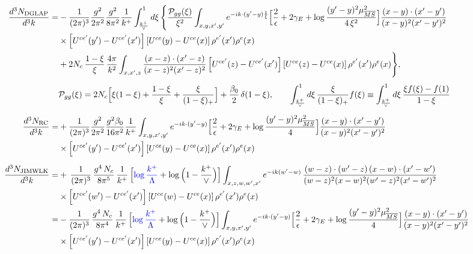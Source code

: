 \documentclass[9pt]{article}
\numberwithin{equation}{section}
\begin{document}
\begin{align}
\frac{d^{3}N_{\rm DGLAP}}{d^{3}k}= &-\frac{1}{(2\pi)^{3}}\frac{g^{2}}{2\pi^{2}}\frac{g^{2}}{8\pi^{2}}\frac{1}{k^{+}}\int_{\frac{k^{+}}{\vee}}^{1}d\xi\,\Bigg\{\frac{\mathcal P_{gg}(\xi)}{\xi^{2}}\int_{x,y,x',y'}e^{-ik\cdot(y'-y)\frac{1}{\xi}}\Big[\frac{2}{\epsilon}+2\gamma_{E}+\log\frac{(y'-y)^{2}\mu^{2}_{\overline{MS}}}{4\,\xi^{2}}\Big]\frac{(x-y)\cdot(x'-y')}{(x-y)^{2}(x'-y')^{2}}\notag\\
&\times\left[U^{ce'}(y') - U^{ce'}(x')\right]\left[U^{ce}(y) - U^{ce}(x)\right]\rho^{e'}(x')\rho^{e}(x)\notag\\
&+2N_{c}\,\frac{1-\xi}{\xi}\,\frac{4\pi}{k^{2}}\int_{x,x',z}\frac{(x-z)\cdot(x'-z)}{(x-z)^{2}(x'-z)^{2}}\left[U^{ce'}(z) - U^{ce'}(x')\right]\left[U^{ce}(z) - U^{ce}(x)\right]\rho^{e'}(x')\rho^{e}(x)\Bigg\},\\[4pt]
&\mathcal P_{gg}(\xi)=2N_{c}\Big[\xi(1-\xi)+\frac{1-\xi}{\xi}+\frac{\xi}{(1-\xi)_{+}}\Big]+\frac{\beta_{0}}{2}\,\delta(1-\xi),\qquad
\int_{\frac{k^{+}}{\vee}}^{1}d\xi\,\frac{\xi}{(1-\xi)_{+}}f(\xi)\equiv\int_{\frac{k^{+}}{\vee}}^{1}d\xi\,\frac{\xi f(\xi)-f(1)}{1-\xi}\notag\\[6pt]
\frac{d^{3}N_{\rm RC}}{d^{3}k}= & +\frac{1}{(2\pi)^{3}}\frac{g^{2}}{2\pi^{2}}\frac{g^{2}\beta_{0}}{16\pi^{2}}\frac{1}{k^{+}}\int_{x,y,x',y'}e^{-ik\cdot(y'-y)}\Big[\frac{2}{\epsilon}+2\gamma_{E}+\log\frac{(y'-y)^{2}\mu^{2}_{\overline{MS}}}{4}\Big]\frac{(x-y)\cdot(x'-y')}{(x-y)^{2}(x'-y')^{2}}\notag\\
&\times\left[U^{ce'}(y') - U^{ce'}(x')\right]\left[U^{ce}(y) - U^{ce}(x)\right]\rho^{e'}(x')\rho^{e}(x)\\[6pt]
\frac{d^{3}N_{\rm JIMWLK}}{d^{3}k}= & +\,\frac{1}{(2\pi)^{3}}\,\frac{g^{4}\,N_{c}}{8\pi^{5}}\,\frac{1}{k^{+}}\,\Big[{\color{blue}\log\frac{k^{+}}{\Lambda}}+\log\Big(1-\frac{k^{+}}{\vee}\Big)\Big]\int_{x,z,w,w',x'}e^{-ik(w'-w)}\,\frac{(w-z)\cdot (w'-z)\,(x-w)\cdot (x'-w')}{(w-z)^{2}(x-w)^{2}(w'-z)^{2}(x'-w')^{2}}\notag\\
&\times\left[U^{ce'}(w') - U^{ce'}(x')\right]\left[U^{ce}(w) - U^{ce}(x)\right]\rho^{e'}(x') \rho^{e}(x)\notag \\
= & -\frac{1}{(2\pi)^{3}}\,\frac{g^{4}\,N_{c}}{8\pi^{4}}\,\frac{1}{k^{+}}\,\Big[{\color{blue}\log\frac{k^{+}}{\Lambda}}+\log\Big(1-\frac{k^{+}}{\vee}\Big)\Big]\int_{x,y,x',y'}e^{-ik\cdot(y'-y)}\Big[\frac{2}{\epsilon}+2\gamma_{E}+\log\frac{(y'-y)^{2}\mu^{2}_{\overline{MS}}}{4}\Big]\frac{(x-y)\cdot(x'-y')}{(x-y)^{2}(x'-y')^{2}}\notag\\
&\times\left[U^{ce'}(y') - U^{ce'}(x')\right]\left[U^{ce}(y) - U^{ce}(x)\right]\rho^{e'}(x')\rho^{e}(x)\\[6pt]

\end{align}
\end{document}
